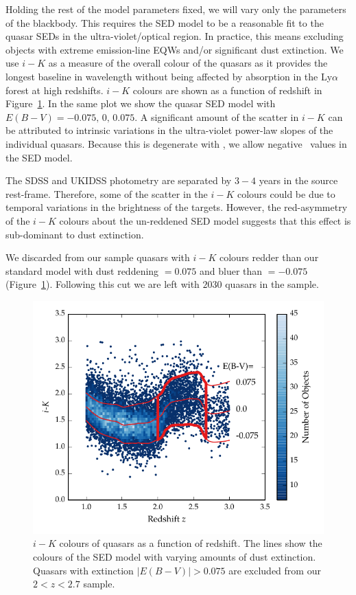 Holding the rest of the model parameters fixed, we will vary only the parameters of the blackbody.
This requires the SED model to be a reasonable fit to the quasar SEDs in the ultra-violet/optical region.
In practice, this means excluding objects with extreme emission-line EQWs and/or significant dust extinction.
We use $i-K$ as a measure of the overall colour of the quasars as it provides the longest baseline in wavelength without being affected by absorption in the Ly$\alpha$ forest at high redshifts.
$i-K$ colours are shown as a function of redshift in Figure~\ref{fig:ikzplot}.
In the same plot we show the quasar SED model with $E(B-V)=-0.075,\,0,\,0.075$.
A significant amount of the scatter in $i-K$ can be attributed to intrinsic variations in the ultra-violet power-law slopes of the individual quasars.
Because this is degenerate with \ebv, we allow negative \ebv\, values in the SED model.

The SDSS and UKIDSS photometry are separated by $3-4$ years in the source rest-frame.
Therefore, some of the scatter in the $i-K$ colours could be due to temporal variations in the brightness of the targets.
However, the red-asymmetry of the $i-K$ colours about the un-reddened SED model suggests that this effect is sub-dominant to dust extinction.

We discarded from our sample quasars with $i - K$ colours redder than our standard model with dust reddening \ebv $= 0.075$ and bluer than \ebv $=-0.075$ (Figure~\ref{fig:ikzplot}).
Following this cut we are left with $2030$ quasars in the sample.

\begin{figure}[t!]
  \centering
  \includegraphics[width=\columnwidth]{figures/chapter05/ik_versus_z_low_ext.pdf}
  \caption[{$i-K$ colours of quasars as a function of redshift.}]{$i-K$ colours of quasars as a function of redshift. The lines show the colours of the SED model with varying amounts of dust extinction. Quasars with extinction $|E(B-V)|>0.075$ are excluded from our $2 < z < 2.7$ sample.}
  \label{fig:ikzplot}
\end{figure}

